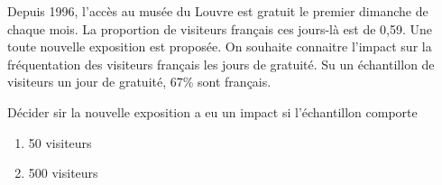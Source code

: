 
Depuis 1996, l'accès au musée du Louvre est gratuit le premier dimanche de chaque mois. La proportion de visiteurs français ces jours-là est de 0,59. Une toute nouvelle exposition est proposée. On souhaite connaitre l'impact sur la fréquentation des visiteurs français les jours de gratuité. Su un échantillon de visiteurs un jour de gratuité, 67\% sont français.

Décider sir la nouvelle exposition a eu un impact si l'échantillon comporte
\begin{enumerate}
\item 50 visiteurs
\item 500 visiteurs
\end{enumerate}
